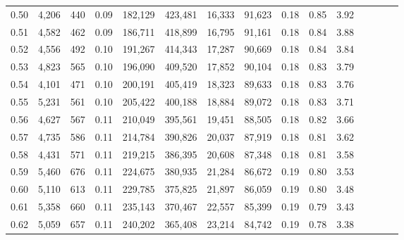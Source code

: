\begin{tabular}{rrrcrrrrrrrrrrr}
0.50 &   4,206 &     440 &                                       0.09 &  182,129 &  423,481 &   16,333 &   91,623 &  0.18 &  0.85 &                         3.92 \\
0.51 &   4,582 &     462 &                                       0.09 &  186,711 &  418,899 &   16,795 &   91,161 &  0.18 &  0.84 &                         3.88 \\
0.52 &   4,556 &     492 &                                       0.10 &  191,267 &  414,343 &   17,287 &   90,669 &  0.18 &  0.84 &                         3.84 \\
0.53 &   4,823 &     565 &                                       0.10 &  196,090 &  409,520 &   17,852 &   90,104 &  0.18 &  0.83 &                         3.79 \\
0.54 &   4,101 &     471 &                                       0.10 &  200,191 &  405,419 &   18,323 &   89,633 &  0.18 &  0.83 &                         3.76 \\
0.55 &   5,231 &     561 &                                       0.10 &  205,422 &  400,188 &   18,884 &   89,072 &  0.18 &  0.83 &                         3.71 \\
0.56 &   4,627 &     567 &                                       0.11 &  210,049 &  395,561 &   19,451 &   88,505 &  0.18 &  0.82 &                         3.66 \\
0.57 &   4,735 &     586 &                                       0.11 &  214,784 &  390,826 &   20,037 &   87,919 &  0.18 &  0.81 &                         3.62 \\
0.58 &   4,431 &     571 &                                       0.11 &  219,215 &  386,395 &   20,608 &   87,348 &  0.18 &  0.81 &                         3.58 \\
0.59 &   5,460 &     676 &                                       0.11 &  224,675 &  380,935 &   21,284 &   86,672 &  0.19 &  0.80 &                         3.53 \\
0.60 &   5,110 &     613 &                                       0.11 &  229,785 &  375,825 &   21,897 &   86,059 &  0.19 &  0.80 &                         3.48 \\
0.61 &   5,358 &     660 &                                       0.11 &  235,143 &  370,467 &   22,557 &   85,399 &  0.19 &  0.79 &                         3.43 \\
0.62 &   5,059 &     657 &                                       0.11 &  240,202 &  365,408 &   23,214 &   84,742 &  0.19 &  0.78 &                         3.38 \\

\end{tabular}
